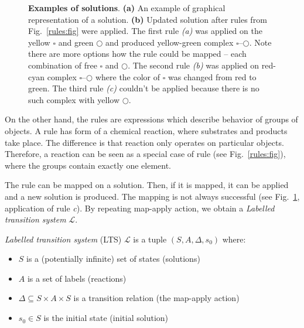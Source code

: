 \documentclass[12pt]{fithesis2}
\begin{document}
\begin{figure}
\begin{center}
\caption{\textbf{Examples of solutions}. \textbf{(a)} An example of graphical representation of a solution. \textbf{(b)} Updated solution after rules from Fig.~\ref{rules:fig} were applied. The first rule \textit{(a)} was applied on the yellow $\square$ and green $\bigcirc$ and produced yellow-green complex $\square$--$\bigcirc$. Note there are more options how the rule could be mapped -- each combination of free $\square$ and $\bigcirc$. The second rule \textit{(b)} was applied on red-cyan complex $\square$--$\bigcirc$ where the color of $\square$ was changed from red to green. The third rule \textit{(c)} couldn't be applied because there is no such complex with yellow $\bigcirc$. }
\label{solutions:fig}
\end{center}
\end{figure}

On the other hand, the rules are expressions which describe behavior of groups of objects. A rule has form of a chemical reaction, where substrates and products take place. The difference is that reaction only operates on particular objects. Therefore, a reaction can be seen as a special case of rule (see Fig.~\ref{rules:fig}), where the groups contain exactly one element.

The rule can be mapped on a solution. Then, if it is mapped, it can be applied and a new solution is produced. The mapping is not always successful (see Fig.~\ref{solutions:fig}, application of rule \textit{c}). By repeating map-apply action, we obtain a \textit{Labelled transition system} $\mathcal{L}$.

\begin{def}\label{lts}
\textit{Labelled transition system} (LTS) $\mathcal{L}$ is a tuple $(S, A, \Delta, s_0)$ where:
\begin{itemize}
  \item $S$ is a (potentially infinite) set of states (solutions)
  \item $A$ is a set of labels (reactions)
  \item $\Delta \subseteq S \times A \times S$ is a transition relation (the map-apply action)
  \item $s_0 \in S$ is the initial state (initial solution)
\end{itemize}
\end{def}
\end{document}
